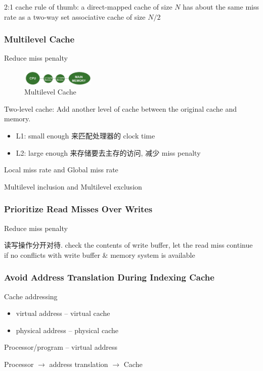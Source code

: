 2:1 cache rule of thumb: a direct-mapped cache of size $N$ has about the same miss rate as a two-way set associative cache of size $N/2$

\subsubsection{Multilevel Cache}
Reduce miss penalty

\begin{figure}[!htb]
    \centering
    \includegraphics[width=0.309\textwidth]{pic/CA2/Multilevel Cache}
    \caption{Multilevel Cache}
\end{figure}

Two-level cache: Add another level of cache between the original cache and memory.
\begin{itemize}
    \item L1: small enough 来匹配处理器的 clock time
    \item L2: large enough 来存储要去主存的访问, 减少 miss penalty
\end{itemize}

Local miss rate and Global miss rate

Multilevel inclusion and Multilevel exclusion

\subsubsection{Prioritize Read Misses Over Writes}
Reduce miss penalty

读写操作分开对待. check the contents of write buffer, let the read miss continue if no conflicts with write buffer \& memory system is available


\subsubsection{Avoid Address Translation During Indexing Cache}
Cache addressing
\begin{itemize}
    \item virtual address -- virtual cache
    \item physical address -- physical cache
\end{itemize}
Processor/program -- virtual address

Processor $\to$ address translation $\to$ Cache

